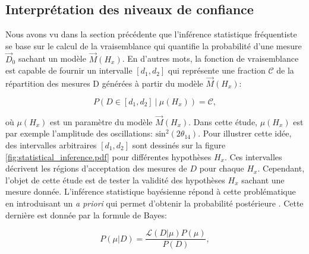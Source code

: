 \subsection{Interprétation des niveaux de confiance}

Nous avons vu dans la section précédente que l'inférence statistique fréquentiste se base sur le calcul de la vraisemblance qui quantifie la probabilité d'une mesure $\overrightarrow{D}_0$ sachant un modèle $\overrightarrow{M}(H_x)$. En d'autres mots, la fonction de vraisemblance est capable de fournir un intervalle $[d_1, d_2]$ qui représente une fraction $\mathcal{C}$ de la répartition des mesures D générées à partir du modèle $\overrightarrow{M}(H_x)$:

\begin{equation}
    P\left(D \in [d_1, d_2]\ |\ \mu (H_x)\right) = \mathcal{C},
\end{equation}

\bigbreak

où $\mu (H_x)$ est un paramètre du modèle $\overrightarrow{M}(H_x)$. Dans cette étude, $\mu (H_x)$ est par exemple l'amplitude des oscillations: $\textrm{sin}^2(2\theta_{14})$. Pour illustrer cette idée, des intervalles arbitraires $[d_1, d_2]$ sont dessinés sur la figure \ref{fig:statistical_inference.pdf} pour différentes hypothèses $H_x$. Ces intervalles décrivent les \og régions d'acceptation \fg{} des mesures de $D$ pour chaque $H_x$. Cependant, l'objet de cette étude est de tester la validité des hypothèses $H_x$ sachant une mesure donnée. L'inférence statistique bayésienne répond à cette problématique en introduisant un \og \textit{a priori} \fg{} qui permet d'obtenir la probabilité \og postérieure \fg{}. Cette dernière est donnée par la formule de Bayes:

\begin{equation}
    P\left(\mu | D \right) = \frac{\mathcal{L} \left(D | \mu\right) P\left(\mu \right)}{P\left(D\right)},
\end{equation}

